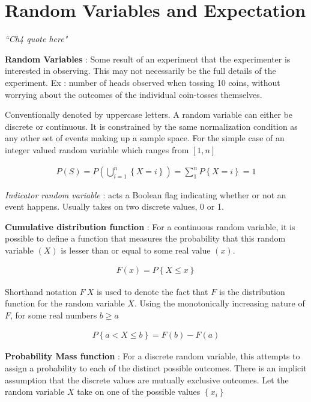 \chapter{Random Variables and Expectation}


\begin{flushright}
	\textit{``Ch4 quote here"} 
\end{flushright}

\textbf{Random Variables} : Some result of an experiment that the experimenter is interested in observing. This may not necessarily be the full details of the experiment. Ex : number of heads observed when tossing 10 coins, without worrying about the outcomes of the individual coin-tosses themselves.

Conventionally denoted by uppercase letters. A random variable can either be discrete or continuous. It is constrained by the same normalization condition as any other set of events making up a sample space. For the simple case of an integer valued random variable which ranges from $ \left[1, n\right] $

\begin{align}
	P(S) = P \left( \bigcup_{i = 1}^{n}\left\{X = i\right\} \right) = \sum_{1}^{n} P \left\{X = i\right\} = 1
\end{align}

\textit{Indicator random variable} : acts a Boolean flag indicating whether or not an event happens. Usually takes on two discrete values, 0 or 1.

\textbf{Cumulative distribution function} : For a continuous random variable, it is possible to define a function that measures the probability that this random variable $ (X) $ is lesser than or equal to some real value $ (x) $.

\begin{align}
	F(x) = P \left\{ X \leq x \right\}
\end{align}

Shorthand notation $ F ~ X $ is used to denote the fact that $ F $ is the distribution function for the random variable $ X $. Using the monotonically increasing nature of $ F $, for some real numbers $ b \geq a $

\begin{align}
	P \left\{ a < X \leq b \right\} = F(b) - F(a)
\end{align}

\textbf{Probability Mass function} : For a discrete random variable, this attempts to assign a probability to each of the distinct possible outcomes. There is an implicit assumption that the discrete values are mutually exclusive outcomes. Let the random variable $ X $ take on one of the possible values $ \left\{x_i\right\} $

